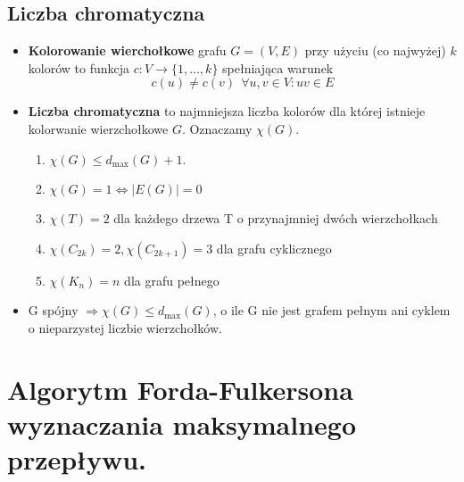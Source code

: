 \documentclass[main.tex]{subfiles}
\begin{document}
    \subsection{Liczba chromatyczna}

    \begin{itemize}
        \item \textbf{Kolorowanie wierchołkowe} grafu $G = (V, E)$ przy użyciu (co najwyżej) $k$
        kolorów to funkcja $c: V \rightarrow \{1, \dots, k\}$ spełniająca warunek
        \[c(u) \neq c(v) ~~ \forall u, v \in V : uv \in E\]

        \item \textbf{Liczba chromatyczna} to najmniejsza liczba kolorów dla
        której istnieje kolorwanie wierzchołkowe $G$. Oznaczamy $\chi(G)$.
        \begin{enumerate}
            \item $\chi(G) \leq d_{\max}(G) + 1$.
            \item $\chi(G) = 1 \Leftrightarrow |E(G)| = 0$
            \item $\chi(T) = 2$ dla każdego drzewa T o przynajmniej dwóch wierzchołkach
            \item $\chi(C_{2k}) = 2, \chi(C_{2k+1}) = 3$ dla grafu cyklicznego
            \item $\chi(K_n) = n$ dla grafu pełnego
        \end{enumerate}

        \item G spójny $\Rightarrow \chi(G) \leq d_{\max}(G)$, o ile G nie jest grafem pełnym ani cyklem o
        nieparzystej liczbie wierzchołków.
    \end{itemize}


    \section{Algorytm Forda-Fulkersona wyznaczania maksymalnego przepływu.}
\end{document}

